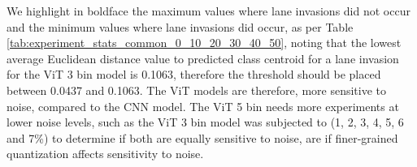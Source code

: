 We highlight in boldface the maximum values where lane invasions did not occur and the minimum values where lane invasions did occur, as per Table \ref{tab:experiment_stats_common_0_10_20_30_40_50}, noting that the lowest average Euclidean distance value to predicted class centroid for a lane invasion for the ViT 3 bin model is 0.1063, therefore the threshold should be placed between 0.0437 and 0.1063. The ViT models are therefore, more sensitive to noise, compared to the CNN model. The ViT 5 bin needs more experiments at lower noise levels, such as the ViT 3 bin model was subjected to (1, 2, 3, 4, 5, 6 and 7\%) to determine if both are equally sensitive to noise, are if finer-grained quantization affects sensitivity to noise.
